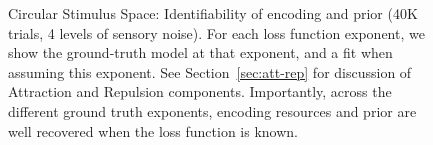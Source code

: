 \begin{figure}
\begin{minipage}[b]{0.45\linewidth}

\end{minipage}


\caption{Circular Stimulus Space: Identifiability of encoding and prior (40K trials, 4 levels of sensory noise).
For each loss function exponent, we show the ground-truth model at that exponent, and a fit when assuming this exponent.
See Section~\ref{sec:att-rep} for discussion of Attraction and Repulsion components.
Importantly, across the different ground truth exponents, encoding resources and prior are well recovered when the loss function is known.
}
\label{fig:recover-model-circ-periodic-uniform}


\end{figure}


